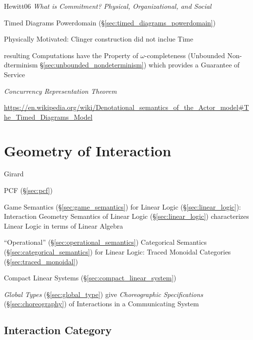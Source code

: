Hewitt06 \emph{What is Commitment? Physical, Organizational, and
  Social}

Timed Diagrams Powerdomain (\S\ref{sec:timed_diagrams_powerdomain})

Physically Motivated: Clinger construction did not inclue Time

resulting Computations have the Property of $\omega$-completeness
(Unbounded Non-dterminism \S\ref{sec:unbounded_nondeterminism}) which
provides a Guarantee of Service %


\emph{Concurrency Representation Theorem} %

\url{https://en.wikipedia.org/wiki/Denotational_semantics_of_the_Actor_model#The_Timed_Diagrams_Model}


\endgroup



\section{Geometry of Interaction}\label{sec:interaction_geometry}

Girard

PCF (\S\ref{sec:pcf})

Game Semantics (\S\ref{sec:game_semantics}) for Linear Logic
(\S\ref{sec:linear_logic}): Interaction Geometry Semantics of Linear
Logic (\S\ref{sec:linear_logic}) characterizes Linear Logic in terms
of Linear Algebra


``Operational'' (\S\ref{sec:operational_semantics}) Categorical
Semantics (\S\ref{sec:categorical_semantics}) for Linear Logic: Traced
Monoidal Categories (\S\ref{sec:traced_monoidal})

Compact Linear Systems (\S\ref{sec:compact_linear_system})

\cite{abramsky-gay-nagarajan96}

\fist \emph{Global Types} (\S\ref{sec:global_type}) give
\emph{Choreographic Specifications} (\S\ref{sec:choreography}) of
Interactions in a Communicating System



\subsection{Interaction Category}\label{sec:interaction_category}
\cite{abramsky-gay-nagarajan96}

